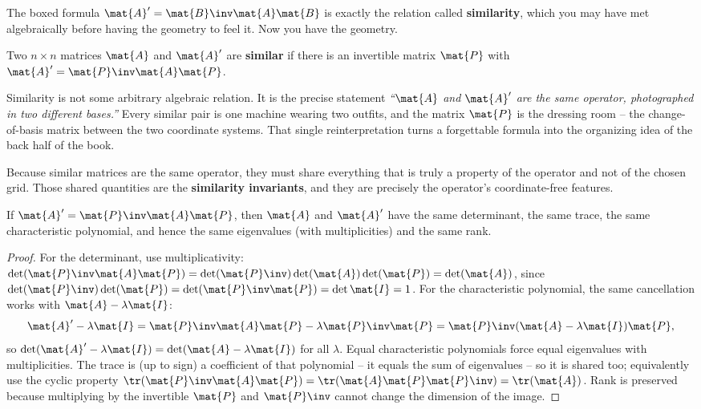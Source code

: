 The boxed formula $\mat{A}'=\mat{B}\inv\mat{A}\mat{B}$ is exactly the relation
called \textbf{similarity}, which you may have met algebraically before having the
geometry to feel it. Now you have the geometry.

\begin{definition}
\label{ch31:def-similar}
Two $n\times n$ matrices $\mat{A}$ and $\mat{A}'$ are \textbf{similar} if there is
an invertible matrix $\mat{P}$ with $\mat{A}'=\mat{P}\inv\mat{A}\mat{P}$.
\end{definition}

\begin{aestheticbox}
Similarity is not some arbitrary algebraic relation. It is the precise statement
\emph{``$\mat{A}$ and $\mat{A}'$ are the same operator, photographed in two
different bases.''} Every similar pair is one machine wearing two outfits, and the
matrix $\mat{P}$ is the dressing room -- the change-of-basis matrix between the two
coordinate systems. That single reinterpretation turns a forgettable formula into
the organizing idea of the back half of the book.
\end{aestheticbox}

Because similar matrices are the same operator, they must share everything that is
truly a property of the operator and not of the chosen grid. Those shared
quantities are the \textbf{similarity invariants}, and they are precisely the
operator's coordinate-free features.

\begin{theorem}
\label{ch31:thm-invariants}
If $\mat{A}'=\mat{P}\inv\mat{A}\mat{P}$, then $\mat{A}$ and $\mat{A}'$ have the
same determinant, the same trace, the same characteristic polynomial, and hence
the same eigenvalues (with multiplicities) and the same rank.
\end{theorem}

\begin{proof}
For the determinant, use multiplicativity:
$\det(\mat{P}\inv\mat{A}\mat{P}) = \det(\mat{P}\inv)\det(\mat{A})\det(\mat{P})
= \det(\mat{A})$, since $\det(\mat{P}\inv)\det(\mat{P})=\det(\mat{P}\inv\mat{P})=\det\mat{I}=1$.
For the characteristic polynomial, the same cancellation works with
$\mat{A}-\lambda\mat{I}$:
\[
  \mat{A}'-\lambda\mat{I} = \mat{P}\inv\mat{A}\mat{P}-\lambda\mat{P}\inv\mat{P}
  = \mat{P}\inv(\mat{A}-\lambda\mat{I})\mat{P},
\]
so $\det(\mat{A}'-\lambda\mat{I})=\det(\mat{A}-\lambda\mat{I})$ for all $\lambda$.
Equal characteristic polynomials force equal eigenvalues with multiplicities. The
trace is (up to sign) a coefficient of that polynomial -- it equals the sum of
eigenvalues -- so it is shared too; equivalently use the cyclic property
$\tr(\mat{P}\inv\mat{A}\mat{P})=\tr(\mat{A}\mat{P}\mat{P}\inv)=\tr(\mat{A})$.
Rank is preserved because multiplying by the invertible $\mat{P}$ and $\mat{P}\inv$
cannot change the dimension of the image.
\end{proof}

